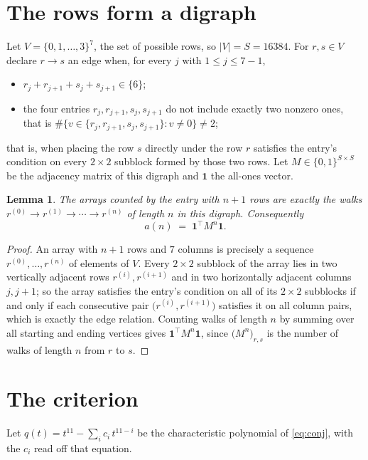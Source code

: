 \documentclass[11pt,a4paper]{article}
\theoremstyle{plain}
\newtheorem{lemma}[theorem]{Lemma}
\theoremstyle{definition}
\begin{document}
\section{The rows form a digraph}

Let $V=\{0,1,\dots,3\}^{7}$, the set of possible rows, so $|V|=S=16384$. For
$r,s\in V$ declare $r\to s$ an edge when, for every $j$ with $1\le j\le 7-1$,
\begin{itemize}
\item $r_j+r_{j+1}+s_j+s_{j+1}\in\{6\}$;
\item the four entries $r_j,r_{j+1},s_j,s_{j+1}$ do not include exactly two nonzero ones, that is $\#\bigl\{v\in\{r_j,r_{j+1},s_j,s_{j+1}\}: v\ne0\bigr\}\ne2$;
\end{itemize}
that is, when placing the row $s$ directly under the row $r$ satisfies the entry's
condition on every $2\times2$ subblock formed by those two rows. Let $M\in\{0,1\}^{S\times
S}$ be the adjacency matrix of this digraph and $\mathbf{1}$ the all-ones vector.

\begin{lemma}\label{lem:walk}
The arrays counted by the entry with $n+1$ rows are exactly the walks
$r^{(0)}\to r^{(1)}\to\cdots\to r^{(n)}$ of length $n$ in this digraph. Consequently
\[
a(n)\;=\;\mathbf{1}^{\!\top}M^{n}\mathbf{1} .
\]
\end{lemma}

\begin{proof}
An array with $n+1$ rows and $7$ columns is precisely a sequence
$r^{(0)},\dots,r^{(n)}$ of elements of $V$. Every $2\times2$ subblock of the array lies
in two vertically adjacent rows $r^{(i)},r^{(i+1)}$ and in two horizontally adjacent
columns $j,j+1$; so the array satisfies the entry's condition on all of its $2\times2$
subblocks if and only if each consecutive pair $\bigl(r^{(i)},r^{(i+1)}\bigr)$ satisfies
it on all column pairs, which is exactly the edge relation. Counting walks of length $n$ by
summing over all starting and ending vertices gives
$\mathbf{1}^{\!\top}M^{n}\mathbf{1}$, since
$\bigl(M^{n}\bigr)_{r,s}$ is the number of walks of length $n$ from $r$ to $s$.
\end{proof}

\section{The criterion}

Let $q(t)=t^{11}-\sum_{i}c_i\,t^{11-i}$ be the characteristic polynomial of
\eqref{eq:conj}, with the $c_i$ read off that equation.
\end{document}
